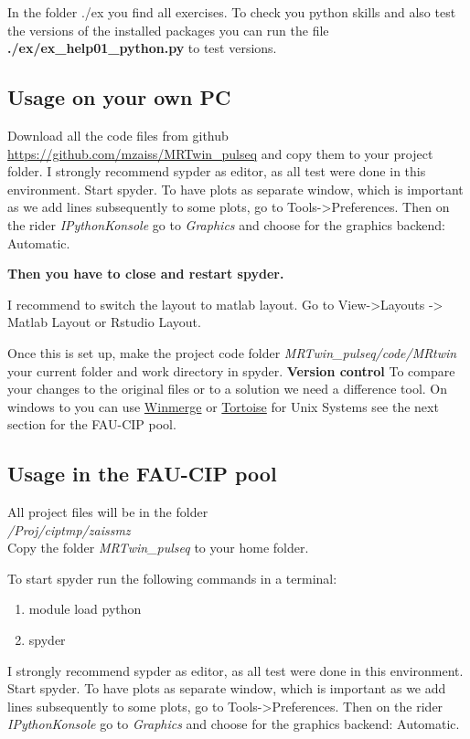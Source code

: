 \documentclass[a4paper,12pt]{extarticle}
\begin{document}
In the folder ./ex you find all exercises. 
To check you python skills and also test the versions of the installed packages you can run the file \textbf{./ex/ex\_help01\_python.py} to test versions.

\subsection{Usage on your own PC}
Download all the code files from github \href{https://github.com/mzaiss/MRTwin_pulseq}{https://github.com/mzaiss/MRTwin\_pulseq}   and copy them to your project folder.
I strongly recommend sypder as editor, as all test were done in this environment.
Start spyder.
To have plots as separate window, which is important as we add lines subsequently to some plots, go to Tools->Preferences. Then on the rider \emph{IPythonKonsole} go to \emph{Graphics} and choose for the graphics backend: Automatic. 

\textbf{Then you have to close and restart spyder.}

I recommend to switch the layout to matlab layout. Go to View->Layouts -> Matlab Layout or Rstudio Layout.

Once this is set up, make the project code folder \emph{MRTwin\_pulseq/code/MRtwin} your current folder and work directory in spyder. 
\textbf{Version control}
To compare your changes to the original files or to a solution we need a difference tool. On windows to you can use \href{https://winmerge.org/}{Winmerge} or \href{https://tortoisegit.org/}{Tortoise} for Unix Systems see the next section for the FAU-CIP pool.

\subsection{Usage in the FAU-CIP pool}\label{sec:spyder_cip}
All project files will be in the folder \\
\emph{/Proj/ciptmp/zaissmz}
\\
Copy the folder \emph{MRTwin\_pulseq} to your home folder.

To start spyder run the following commands in a terminal:
\begin{enumerate}
\item module load python
\item spyder
\end{enumerate}

I strongly recommend sypder as editor, as all test were done in this environment.
Start spyder.
To have plots as separate window, which is important as we add lines subsequently to some plots, go to Tools->Preferences. Then on the rider \emph{IPythonKonsole} go to \emph{Graphics} and choose for the graphics backend: Automatic.
\end{document}
